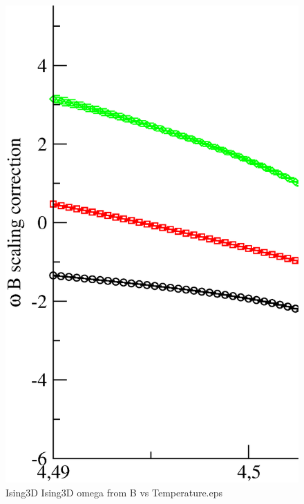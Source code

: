 \begin{figure}[!htpb]
  \centering
  \includegraphics[width=\textwidth]{./plots/Ising3D/Ising3D_omega_from_B_vs_Temperature.eps}
  \caption{Ising3D Ising3D omega from B vs Temperature.eps}
\end{figure}

